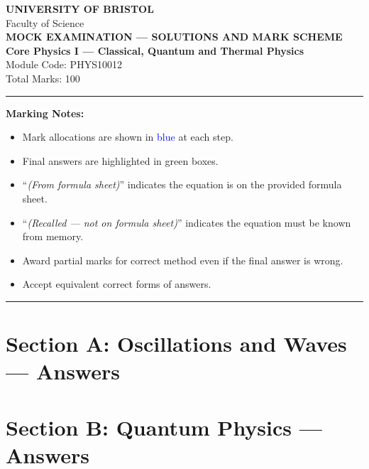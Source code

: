 \documentclass[12pt,a4paper]{article}
\newcommand{\fromsheet}{\textit{(From formula sheet)}}
\newcommand{\recalled}{\textit{(Recalled --- not on formula sheet)}}
\newcounter{mcqcounter}
\begin{document}
\begin{center}
{\Large\textbf{UNIVERSITY OF BRISTOL}}\\[0.3cm]
{\large Faculty of Science}\\[0.5cm]
{\Large\textbf{MOCK EXAMINATION --- SOLUTIONS AND MARK SCHEME}}\\[0.3cm]
{\large\textbf{Core Physics I --- Classical, Quantum and Thermal Physics}}\\[0.2cm]
{\large Module Code: PHYS10012}\\[0.5cm]
{\large Total Marks: 100}\\[0.3cm]
\end{center}

\noindent\rule{\textwidth}{0.4pt}

\vspace{0.3cm}
\noindent\textbf{Marking Notes:}
\begin{itemize}[itemsep=0.1cm]
\item Mark allocations are shown in \textcolor{blue}{blue} at each step.
\item Final answers are highlighted in green boxes.
\item ``\fromsheet'' indicates the equation is on the provided formula sheet.
\item ``\recalled'' indicates the equation must be known from memory.
\item Award partial marks for correct method even if the final answer is wrong.
\item Accept equivalent correct forms of answers.
\end{itemize}

\noindent\rule{\textwidth}{0.4pt}
\newpage

\section*{Section A: Oscillations and Waves --- Answers}

\setcounter{mcqcounter}{0}


\newpage

\section*{Section B: Quantum Physics --- Answers}
\end{document}
